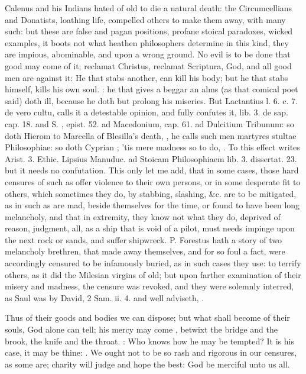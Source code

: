 Calenus and his Indians hated of old to die a natural death: the
Circumcellians and Donatists, loathing life, compelled others to make
them away, with many such: but these are false and pagan
positions, profane stoical paradoxes, wicked examples, it boots not
what heathen philosophers determine in this kind, they are impious,
abominable, and upon a wrong ground. No evil is to be done that good
may come of it; reclamat Christus, reclamat Scriptura, God, and all
good men are against it: He that stabs another, can kill his
body; but he that stabs himself, kills his own soul. : he that gives a beggar an alms (as
that comical poet said) doth ill, because he doth but prolong his
miseries. But Lactantius l. 6. c. 7. de vero cultu, calls it a
detestable opinion, and fully confutes it, lib. 3. de sap. cap. 18. and
S. \Austin, epist. 52. ad Macedonium, cap. 61. ad Dulcitium Tribunum: so
doth Hierom to Marcella of Blesilla's death, , he calls such men martyres stultae Philosophiae: so doth Cyprian
; 'tis mere madness so to do, . To this effect writes Arist. 3. Ethic. Lipsius Manuduc.
\textlatin{ad Stoicam Philosophiaem lib. 3. dissertat. 23.} but it needs no
confutation. This only let me add, that in some cases, those hard
censures of such as offer violence to their own persons, or in some
desperate fit to others, which sometimes they do, by stabbing,
slashing, \&c. are to be mitigated, as in such as are mad, beside
themselves for the time, or found to have been long melancholy, and
that in extremity, they know not what they do, deprived of reason,
judgment, all, as a ship that is void of a pilot, must needs
impinge upon the next rock or sands, and suffer shipwreck. P.
Forestus hath a story of two melancholy brethren, that made away
themselves, and for so foul a fact, were accordingly censured to be
infamously buried, as in such cases they use: to terrify others, as it
did the Milesian virgins of old; but upon farther examination of their
misery and madness, the censure was revoked, and they were
solemnly interred, as Saul was by David, 2 Sam. ii. 4. and \Seneca{} well
adviseth, .

Thus of their goods and bodies we can dispose; but what shall become of
their souls, God alone can tell; his mercy may come , betwixt the bridge and the brook, the
knife and the throat. : Who knows
how he may be tempted? It is his case, it may be thine: . We ought not to be so rash and
rigorous in our censures, as some are; charity will judge and hope the
best: God be merciful unto us all.
